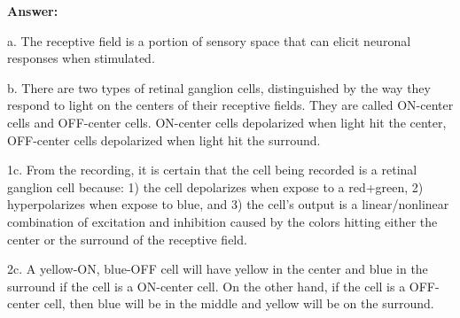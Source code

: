\documentclass[letterpaper, 11pt]{article}
\begin{document}
\textbf{Answer:}

a. The receptive field is a portion of sensory space that can elicit neuronal responses when stimulated.

b. There are two types of retinal ganglion cells, distinguished by the way they respond to light on the centers of their receptive fields. They are called ON-center cells and OFF-center cells. ON-center cells depolarized when light hit the center, OFF-center cells depolarized when light hit the surround.

1c. From the recording, it is certain that the cell being recorded is a retinal ganglion cell because: 1) the cell depolarizes when expose to a red+green, 2) hyperpolarizes when expose to blue, and 3) the cell's output is a linear/nonlinear combination of excitation and inhibition caused by the colors hitting either the center or the surround of the receptive field.

2c. A yellow-ON, blue-OFF cell will have yellow in the center and blue in the surround if the cell is a ON-center cell. On the other hand, if the cell is a OFF-center cell, then blue will be in the middle and yellow will be on the surround.





\end{document}
